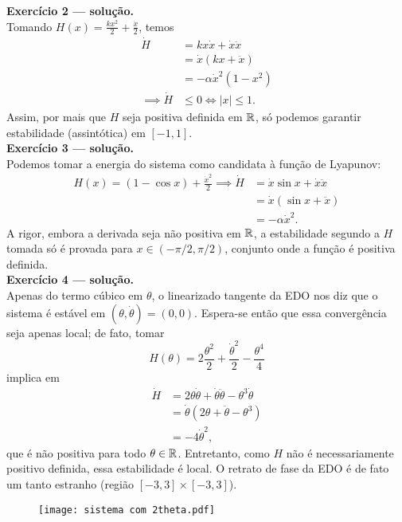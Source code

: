 \noindent
\textbf{\sffamily Exercício 2 --- solução.} \\
	Tomando $H(x) = \frac{kx^2}{2} + \frac{\dot{x}}{2}$, temos 
	\begin{align*}
		\dot{H} &= kx\dot{x} + \dot{x}\ddot{x} \\
		        &= \dot{x}(kx + \ddot{x}) \\
		        &= -\alpha\dot{x}^2(1-x^2) \\
		\implies \dot{H} &\leq 0 \iff |x|\leq 1.
	\end{align*}
	Assim, por mais que $H$ seja positiva definida em $\mathbb{R}$, só podemos garantir estabilidade (assintótica) em $[-1, 1]$. \\

\noindent	
\textbf{\sffamily Exercício 3 --- solução.} \\
	Podemos tomar a energia do sistema como candidata à função de Lyapunov:
	\begin{align*}
		H(x) = (1-\cos x) + \frac{\dot{x}^2}{2} \implies
		\dot{H} &= \dot{x}\sin x + \dot{x}\ddot{x} \\
		        &= \dot{x}(\sin x + \ddot{x}) \\
		        &= -\alpha\dot{x}^2. 
	\end{align*}
	A rigor, embora a derivada seja não positiva em $\mathbb{R}$, a estabilidade segundo a $H$ tomada só é provada para $x\in(-\pi/2, \pi/2)$, conjunto onde a função é positiva definida. \\
	
\noindent
\textbf{\sffamily Exercício 4 --- solução.} \\
	Apenas do termo cúbico em $\theta$, o linearizado tangente da EDO nos diz que o sistema é estável em 
	$(\theta, \dot{\theta}) = (0,0)$. 
	Espera-se então que essa convergência seja apenas local; de fato, tomar 
	\[
		H(\theta) = 2\frac{\theta^2}{2} + 
		            \frac{\dot{\theta}^2}{2} -
		            \frac{\theta^4}{4}
	\]
	implica em
	\begin{align*}
		\dot{H} &= 2\theta\dot{\theta} +
		           \dot{\theta}\ddot{\theta} -
		           \theta^3\dot{\theta} \\
		        &= \dot{\theta}(2\theta + \ddot{\theta} - \theta^3) \\
		        &= -4\dot{\theta}^2,
	\end{align*}
	que é não positiva para todo $\theta\in\mathbb{R}$. 
	Entretanto, como $H$ não é necessariamente positivo definida, essa estabilidade é local. 
	O retrato de fase da EDO é de fato um tanto estranho (região $[-3,3]\times[-3,3]$).
	\begin{figure}[H]\centering
		\texttt{[image: sistema com 2theta.pdf]}
	\end{figure}
























